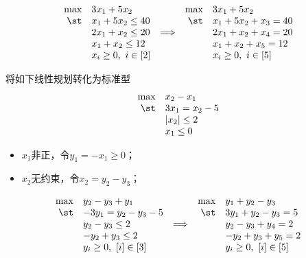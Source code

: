 \documentclass{ctexart}
\begin{document}
\begin{itemize}
          \begin{align}
              \begin{array}{rlcrl} \label{eq: illustration-standard}
                  \max & 3 x_1 + 5 x_2          &                 & \max & 3 x_1 + 5 x_2          \\
                  \st  & x_1 + 5 x_2 \le 40     &                 & \st  & x_1 + 5 x_2 + x_3 = 40 \\
                       & 2 x_1 + x_2 \le 20     & \Longrightarrow &      & 2 x_1 + x_2 + x_4 = 20 \\
                       & x_1 + x_2 \le 12       &                 &      & x_1 + x_2 + x_5 = 12   \\
                       & x_i \ge 0, ~ i \in [2] &                 &      & x_i \ge 0, ~ i \in [5]
              \end{array}
          \end{align}
\end{itemize}

\begin{example}
    将如下线性规划转化为标准型
    \begin{align*}
        \begin{array}{rlcrl}
            \max & x_2 - x_1       \\
            \st  & 3 x_1 = x_2 - 5 \\
                 & |x_2| \le 2     \\
                 & x_1 \le 0
        \end{array}
    \end{align*}
    \begin{itemize}
        \item $x_1$非正，令$y_1 = -x_1 \ge 0$；
        \item $x_2$无约束，令$x_2 = y_2 - y_3$；
    \end{itemize}
    \begin{align*}
        \begin{array}{rlcrl}
            \max & y_2 - y_3 + y_1          &                 & \max & y_1 + y_2 - y_3          \\
            \st  & -3 y_1 = y_2 - y_3 - 5   &                 & \st  & 3 y_1 + y_2 - y_3 = 5    \\
                 & y_2 - y_3 \le 2          & \Longrightarrow &      & y_2 - y_3 + y_4 = 2      \\
                 & -y_2 + y_3 \le 2         &                 &      & -y_2 + y_3 + y_5 = 2     \\
                 & y_i \ge 0, ~ [i] \in [3] &                 &      & y_i \ge 0, ~ [i] \in [5]
        \end{array}
    \end{align*}
\end{example}
\end{document}
